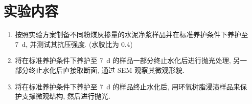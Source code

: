 
\section{实验内容}

\begin{enumerate}[label = 实验 \arabic*]
  \item 按照实验方案制备不同粉煤灰掺量的水泥净浆样品并在标准养护条件下养护至 \SI{7}{\day}, 并测试其抗压强度.
        (水胶比为 \num{0.4})
  \item 将在标准养护条件下养护至 \SI{7}{\day} 的样品一部分终止水化后进行抛光处理, 另一部分终止水化后直接取断面, 通过 SEM 观察其微观形貌.
  \item 将在标准养护条件下养护至 \SI{7}{\day} 的样品终止水化后, 用环氧树脂浸渍样品来保护支撑微观结构, 然后进行抛光.
\end{enumerate}
